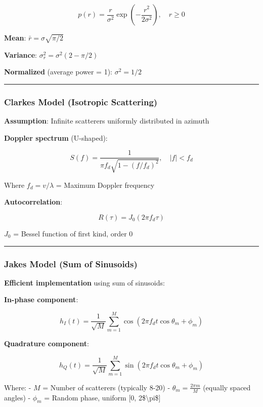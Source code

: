 \[
p(r) = \frac{r}{\sigma^2} \exp\left(-\frac{r^2}{2\sigma^2}\right), \quad r \geq 0
\]

\textbf{Mean}: \(\bar{r} = \sigma\sqrt{\pi/2}\)

\textbf{Variance}: \(\sigma_r^2 = \sigma^2(2 - \pi/2)\)

\textbf{Normalized} (average power = 1): \(\sigma^2 = 1/2\)

\begin{center}\rule{0.5\linewidth}{0.5pt}\end{center}

\subsubsection{Clarke\textquotesingle s Model (Isotropic
Scattering)}\label{clarkes-model-isotropic-scattering}

\textbf{Assumption}: Infinite scatterers uniformly distributed in
azimuth

\textbf{Doppler spectrum} (U-shaped):

\[
S(f) = \frac{1}{\pi f_d \sqrt{1 - (f/f_d)^2}}, \quad |f| < f_d
\]

Where \(f_d = v/\lambda\) = Maximum Doppler frequency

\textbf{Autocorrelation}:

\[
R(\tau) = J_0(2\pi f_d \tau)
\]

\(J_0\) = Bessel function of first kind, order 0

\begin{center}\rule{0.5\linewidth}{0.5pt}\end{center}

\subsubsection{Jakes\textquotesingle{} Model (Sum of
Sinusoids)}\label{jakes-model-sum-of-sinusoids}

\textbf{Efficient implementation} using sum of sinusoids:

\textbf{In-phase component}:

\[
h_I(t) = \frac{1}{\sqrt{M}} \sum_{m=1}^{M} \cos(2\pi f_d t \cos\theta_m + \phi_m)
\]

\textbf{Quadrature component}:

\[
h_Q(t) = \frac{1}{\sqrt{M}} \sum_{m=1}^{M} \sin(2\pi f_d t \cos\theta_m + \phi_m)
\]

Where: - \(M\) = Number of scatterers (typically 8-20) -
\(\theta_m = \frac{2\pi m}{M}\) (equally spaced angles) - \(\phi_m\) =
Random phase, uniform {[}0, 2\$\textbackslash pi\${]}

